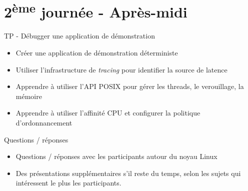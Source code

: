 \documentclass[a4paper,12pt,obeyspaces,spaces,hyphens]{article}
\begin{document}
\section{2\textsuperscript{ème} journée - Après-midi}

\feagendaonecolumn
{TP - Débugger une application de démonstration}
{
  \begin{itemize}
  \item Créer une application de démonstration déterministe
  \item Utiliser l'infrastructure de {\em tracing} pour identifier la source de latence
  \item Apprendre à utiliser l'API POSIX pour gérer les threads, le verouillage, la mémoire
  \item Apprendre à utiliser l'affinité CPU et configurer la politique d'ordonnancement
  \end{itemize}
}

\feagendaonecolumn
{Questions / réponses}
{
  \begin{itemize}
  \item Questions / réponses avec les participants autour du noyau Linux
  \item Des présentations supplémentaires s'il reste du temps, selon les sujets
	qui intéressent le plus les participants.
  \end{itemize}
}
\end{document}

